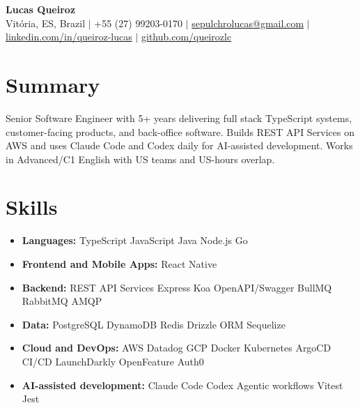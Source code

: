 \documentclass[letterpaper,10pt]{article}
\newcommand{\resumeItem}[1]{\item\small{#1}}
\newcommand{\resumeSubHeadingList}{\begin{itemize}[leftmargin=0.15in, label={}, nosep]}
\newcommand{\resumeSubHeadingListEnd}{\end{itemize}}
\begin{document}
\begin{center}
  \textbf{\Huge Lucas Queiroz} \\[3pt]
  \small Vit\'oria, ES, Brazil $|$ +55 (27) 99203-0170 $|$ \href{mailto:sepulchrolucas@gmail.com}{sepulchrolucas@gmail.com} $|$
  \href{https://linkedin.com/in/queiroz-lucas}{linkedin.com/in/queiroz-lucas} $|$
  \href{https://github.com/queirozlc}{github.com/queirozlc}
\end{center}
\vspace{2pt}

\section{Summary}
Senior Software Engineer with 5+ years delivering full stack TypeScript systems, customer-facing products, and back-office software. Builds REST API Services on AWS and uses Claude Code and Codex daily for AI-assisted development. Works in Advanced/C1 English with US teams and US-hours overlap.

\section{Skills}
\resumeSubHeadingList
\resumeItem{\textbf{Languages:} TypeScript \textbar{} JavaScript \textbar{} Java \textbar{} Node.js \textbar{} Go}
\resumeItem{\textbf{Frontend and Mobile Apps:} React Native}
\resumeItem{\textbf{Backend:} REST API Services \textbar{} Express \textbar{} Koa \textbar{} OpenAPI/Swagger \textbar{} BullMQ \textbar{} RabbitMQ \textbar{} AMQP}
\resumeItem{\textbf{Data:} PostgreSQL \textbar{} DynamoDB \textbar{} Redis \textbar{} Drizzle ORM \textbar{} Sequelize}
\resumeItem{\textbf{Cloud and DevOps:} AWS \textbar{} Datadog \textbar{} GCP \textbar{} Docker \textbar{} Kubernetes \textbar{} ArgoCD \textbar{} CI/CD \textbar{} LaunchDarkly \textbar{} OpenFeature \textbar{} Auth0}
\resumeItem{\textbf{AI-assisted development:} Claude Code \textbar{} Codex \textbar{} Agentic workflows \textbar{} Vitest \textbar{} Jest}
\resumeSubHeadingListEnd
\end{document}
